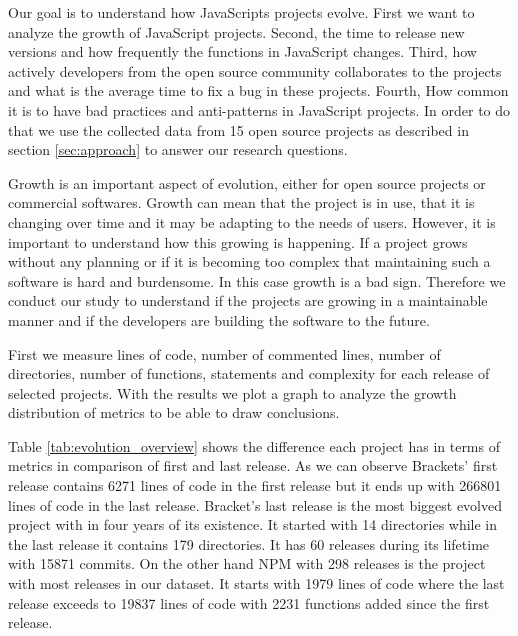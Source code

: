 
Our goal is to understand how JavaScripts projects evolve. First we want to analyze the growth of JavaScript projects. Second, the time to release new versions and how frequently the functions in JavaScript changes. Third, how actively developers from the open source community collaborates to the projects and what is the average time to fix a bug in these projects. Fourth, How common it is to have bad practices and anti-patterns in JavaScript projects. In order to do that we use the collected data from 15 open source projects as described in section \ref{sec:approach} to answer our research questions. 

\vspace{3 mm}
\noindent{\rqi}
\vspace{3 mm}

 Growth is an important aspect of evolution, either for open source projects or commercial softwares. Growth can mean that the project is in use, that it is changing over time and it may be adapting to the needs of users. However, it is important to understand how this growing is happening. If a project grows without any planning or if it is becoming too complex that maintaining such a software is hard and burdensome. In this case growth is a bad sign. Therefore we conduct our study to understand if the projects are growing in a maintainable manner and if the developers are building the software to the future.   

\vspace{1 mm}
 First we measure lines of code, number of commented lines, number of directories, number of functions, statements and complexity for each release of selected projects. With the results we plot a graph to analyze the growth distribution of metrics to be able to draw conclusions. 

\vspace{1 mm}
 Table \ref{tab:evolution_overview} shows the difference each project has in terms of metrics in comparison of first and last release.
As we can observe Brackets' first release contains 6271 lines of code in the first release but it ends up with 266801 lines of code in the last release. Bracket's last release is the most biggest evolved project with in four years of its existence. It started with 14 directories while in the last release it contains 179 directories. It has 60 releases during its lifetime with 15871 commits. On the other hand NPM with 298 releases is the project with most releases in our dataset. It starts with 1979 lines of code where the last release exceeds to 19837 lines of code with 2231 functions added since the first release.


